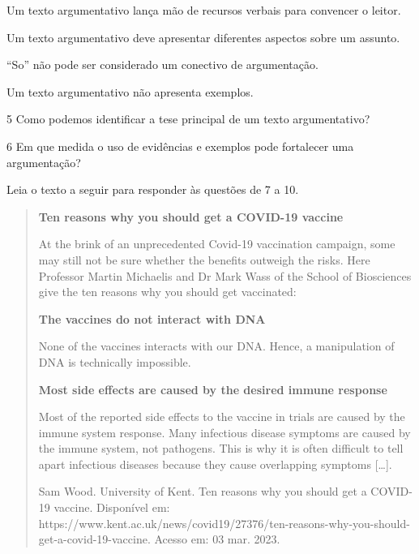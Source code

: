 \begin{boxlist}
\item Um texto argumentativo lança mão de recursos verbais para
convencer o leitor. 

\item Um texto argumentativo deve apresentar diferentes aspectos sobre
um assunto. 

\item ``So'' não pode ser considerado um conectivo de argumentação. 

\item Um texto argumentativo não apresenta exemplos. 
\end{boxlist}

\num{5} Como podemos identificar a tese principal de um texto argumentativo?

\linhas[3]


\num{6} Em que medida o uso de evidências e exemplos pode fortalecer uma argumentação?

\linhas[4]


Leia o texto a seguir para responder às questões de 7 a 10.

\begin{quote}
\textbf{Ten reasons why you should get a COVID-19 vaccine}

At the brink of an unprecedented Covid-19 vaccination campaign, some may
still not be sure whether the benefits outweigh the risks. Here
Professor Martin Michaelis and Dr Mark Wass of the School of Biosciences
give the ten reasons why you should get vaccinated:

\textbf{The vaccines do not interact with DNA}

None of the vaccines interacts with our DNA. Hence, a manipulation of
DNA is technically impossible.

\textbf{Most side effects are caused by the desired immune response}

Most of the reported side effects to the vaccine in trials are caused by
the immune system response. Many infectious disease symptoms are caused
by the immune system, not pathogens. This is why it is often difficult
to tell apart infectious diseases because they cause overlapping
symptoms {[}\ldots{}{]}.

Sam Wood. University of Kent. Ten reasons why you should get a COVID-19
vaccine. Disponível em:
https://www.kent.ac.uk/news/covid19/27376/ten-reasons-why-you-should-get-a-covid-19-vaccine.
Acesso em: 03 mar. 2023.
\end{quote}

